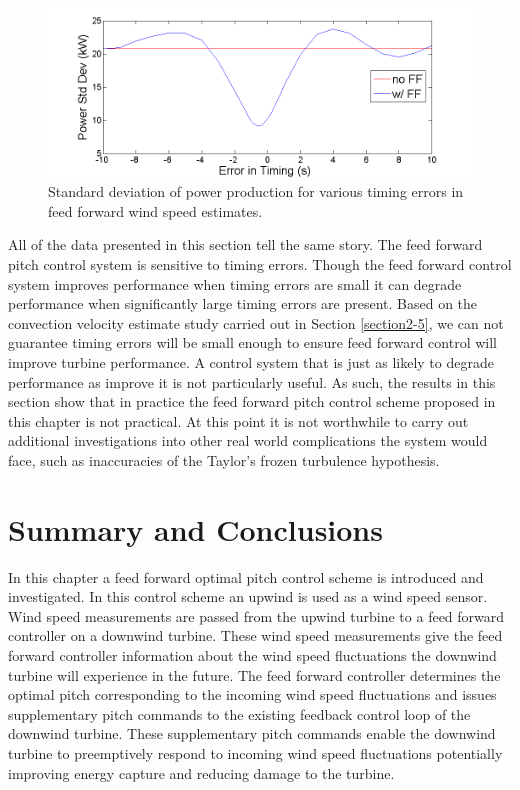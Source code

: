 \begin{figure}[htb]
	\centering
		\includegraphics[width = \linewidth]{Figures/ch3Figures/fig3-38.png}
		
	\caption{Standard deviation of power production for various timing errors in feed forward wind speed estimates.}
	\label{fig3-38}
\end{figure}

All of the data presented in this section tell the same story. The feed forward pitch control system is sensitive to timing errors. Though the feed forward control system improves performance when timing errors are small it can degrade performance when significantly large timing errors are present. Based on the convection velocity estimate study carried out in Section \ref{section2-5}, we can not guarantee timing errors will be small enough to ensure feed forward control will improve turbine performance. A control system that is just as likely to degrade performance as improve it is not particularly useful. As such, the results in this section show that in practice the feed forward pitch control scheme proposed in this chapter is not practical. At this point it is not worthwhile to carry out additional investigations into other real world complications the system would face, such as inaccuracies of the Taylor's frozen turbulence hypothesis.

\section{Summary and Conclusions}

In this chapter a feed forward optimal pitch control scheme is introduced and investigated. In this control scheme an upwind is used as a wind speed sensor. Wind speed measurements are passed from the upwind turbine to a feed forward controller on a downwind turbine. These wind speed measurements give the feed forward controller information about the wind speed fluctuations the downwind turbine will experience in the future. The feed forward controller determines the optimal pitch corresponding to the incoming wind speed fluctuations and issues supplementary pitch commands to the existing feedback control loop of the downwind turbine. These supplementary pitch commands enable the downwind turbine to preemptively respond to incoming wind speed fluctuations potentially improving energy capture and reducing damage to the turbine.

